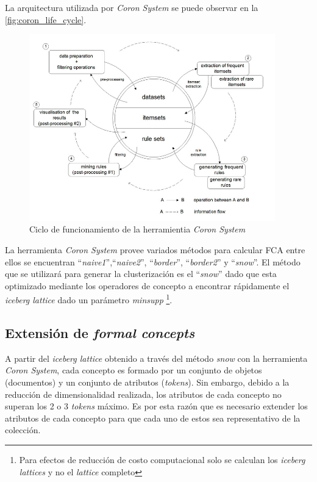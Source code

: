 \documentclass[12pt,oneside,letterpaper]{book}
\newcommand{\eng}[1]{\textit{#1}\xspace}			%
\newcommand{\abr}[1]{\textsc{#1}\xspace}           %
\theoremstyle{definition}
\begin{document}
La arquitectura utilizada por \eng{Coron System} se puede observar en la \autoref{fig:coron_life_cycle}.


\begin{figure}[h!]
	\centering
	\includegraphics[width=0.95\textwidth]{images/coron-lifecycle.jpg}
	\caption{Ciclo de funcionamiento de la herramientia \eng{Coron System}}
	\label{fig:coron_life_cycle}
\end{figure}

\newpage 

La herramienta \emph{Coron System} provee variados métodos para calcular \abr{FCA} entre ellos se encuentran ``\eng{naive1}'',``\eng{naive2}'', ``\eng{border}'', ``\eng{border2}'' y ``\eng{snow}''. El método que se utilizará para generar la clusterización es el ``\eng{snow}'' dado que esta optimizado mediante los operadores de concepto a encontrar rápidamente el \eng{iceberg lattice} dado un parámetro \eng{minsupp} \cite{snowmethod}\footnote{Para efectos de reducción de costo computacional solo se calculan los \eng{iceberg lattices} y no el \eng{lattice} completo}.

\newpage

\subsection{Extensión de \eng{formal concepts}}
\label{sub:extension_de_formal_concepts}
A partir del \eng{iceberg lattice} obtenido a través del método \eng{snow} con la herramienta \eng{Coron System}, cada concepto es formado por un conjunto de objetos (documentos) y un conjunto de atributos (\eng{tokens}). Sin embargo, debido a la reducción de dimensionalidad realizada, los atributos de cada concepto no superan los 2 o 3 \eng{tokens} máximo. Es por esta razón que es necesario extender los atributos de cada concepto para que cada uno de estos sea representativo de la colección.
\end{document}
